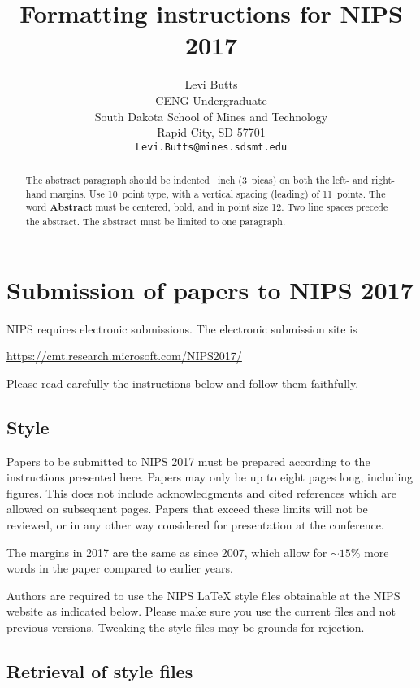 \documentclass{article}
\title{Formatting instructions for NIPS 2017}
\author{
	Levi Butts\\
	CENG Undergraduate\\
	South Dakota School of Mines and Technology\\
	Rapid City, SD 57701 \\
	\texttt{Levi.Butts@mines.sdsmt.edu} \\
}
\begin{document}
	
	\maketitle
	
	\begin{abstract}
		The abstract paragraph should be indented ~inch
		(3~picas) on both the left- and right-hand margins. Use 10~point
		type, with a vertical spacing (leading) of 11~points.  The word
		\textbf{Abstract} must be centered, bold, and in point size 12. Two
		line spaces precede the abstract. The abstract must be limited to
		one paragraph.
	\end{abstract}
	
	\section{Submission of papers to NIPS 2017}
	
	NIPS requires electronic submissions.  The electronic submission site
	is
	\begin{center}
		\url{https://cmt.research.microsoft.com/NIPS2017/}
	\end{center}
	
	Please read carefully the instructions below and follow them
	faithfully.
	
	\subsection{Style}
	
	Papers to be submitted to NIPS 2017 must be prepared according to the
	instructions presented here. Papers may only be up to eight pages
	long, including figures. This does not include acknowledgments and 
	cited references which are allowed on subsequent pages.
	Papers that exceed these limits will not be reviewed, or in any
	other way considered for presentation at the conference.
	
	The margins in 2017 are the same as since 2007, which allow for
	$\sim$$15\%$ more words in the paper compared to earlier years.
	
	Authors are required to use the NIPS \LaTeX{} style files obtainable
	at the NIPS website as indicated below. Please make sure you use the
	current files and not previous versions. Tweaking the style files may
	be grounds for rejection.
	
	\subsection{Retrieval of style files}
	
\end{document}
